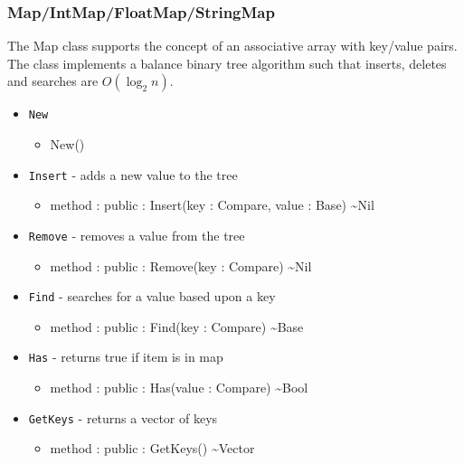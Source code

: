 \documentclass[12pt]{article}
\begin{document}
\subsubsection{Map/IntMap/FloatMap/StringMap}
The Map class supports the concept of an associative array with
key/value pairs.  The class implements a balance binary tree algorithm
such that inserts, deletes and searches are $O(\log_2 n)$.
\begin{itemize}
\item \texttt{New}
  \begin{itemize}
  \item New()
  \end{itemize}
\item \texttt{Insert} - adds a new value to the tree
  \begin{itemize}
  \item method : public : Insert(key : Compare, value : Base) \textasciitilde Nil
  \end{itemize}
\item \texttt{Remove} - removes a value from the tree
  \begin{itemize}
  \item method : public : Remove(key : Compare) \textasciitilde Nil
  \end{itemize}
\item \texttt{Find} - searches for a value based upon a key
  \begin{itemize}
  \item method : public : Find(key : Compare) \textasciitilde Base
  \end{itemize}
\item \texttt{Has} - returns true if item is in map
  \begin{itemize}
  \item method : public : Has(value : Compare) \textasciitilde Bool
  \end{itemize}
\item \texttt{GetKeys} - returns a vector of keys
  \begin{itemize}
  \item method : public : GetKeys() \textasciitilde Vector
  \end{itemize}
\end{itemize}
\end{document}
